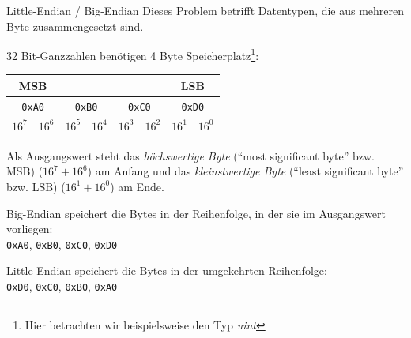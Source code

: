 \begin{example}{Little-Endian / Big-Endian}
    Dieses Problem betrifft Datentypen, die aus mehreren Byte zusammengesetzt sind.

    32 Bit-Ganzzahlen benötigen 4 Byte Speicherplatz\footnote{Hier betrachten wir beispielsweise den Typ \emph{uint}}:

    \begin{center}
        \begin{tabular}{|cc|cc|cc|cc|}
            \multicolumn{2}{c}{\textbf{MSB}}   & \multicolumn{4}{c}{}               & \multicolumn{2}{c}{\textbf{LSB}}                                                                             \\\hline
            \multicolumn{2}{|c}{\texttt{0xA0}} & \multicolumn{2}{|c}{\texttt{0xB0}} & \multicolumn{2}{|c}{\texttt{0xC0}} & \multicolumn{2}{|c|}{\texttt{0xD0}}                                     \\\hline
            $16^7$                             & $16^6$                             & $16^5$                             & $16^4$                              & $16^3$ & $16^2$ & $16^1$ & $16^0$ \\\hline
        \end{tabular}
    \end{center}

    Als Ausgangswert steht das \emph{höchswertige Byte} (\enquote{most significant byte} bzw. MSB) ($16^7 + 16^6$) am Anfang und das \emph{kleinstwertige Byte} (\enquote{least significant byte} bzw. LSB) ($16^1 + 16^0$) am Ende.

    Big-Endian speichert die Bytes in der Reihenfolge, in der sie im Ausgangswert vorliegen:\\
    \texttt{0xA0}, \texttt{0xB0}, \texttt{0xC0}, \texttt{0xD0}

    Little-Endian speichert die Bytes in der umgekehrten Reihenfolge:\\
    \texttt{0xD0}, \texttt{0xC0}, \texttt{0xB0}, \texttt{0xA0}
\end{example}

